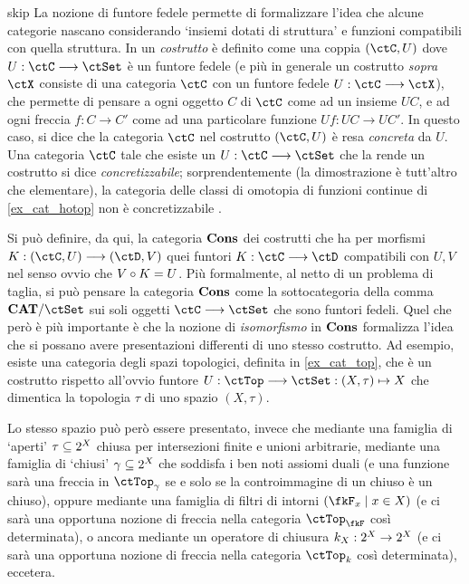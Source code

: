 \begin{hDigression}{skip}\label{def_costrutto}
	La nozione di funtore fedele permette di formalizzare l'idea che alcune categorie nascano considerando `insiemi dotati di struttura' e funzioni compatibili con quella struttura. In \cite[I.5.1]{acc} un \emph{costrutto} è definito come una coppia \((\ctC,U)\) dove \(U : \ctC \fun\ctSet\) è un funtore fedele (e più in generale un costrutto \emph{sopra \(\ctX\)} consiste di una categoria \(\ctC\) con un funtore fedele \(U : \ctC\fun\ctX\)), che permette di pensare a ogni oggetto \(C\) di \(\ctC\) come ad un insieme \(UC\), e ad ogni freccia \(f : C\to C'\) come ad una particolare funzione \(Uf : UC\to UC'\). In questo caso, si dice che la categoria \(\ctC\) nel costrutto \((\ctC,U)\) è resa \emph{concreta} da \(U\). Una categoria \(\ctC\) tale che esiste un \(U : \ctC \fun\ctSet\) che la rende un costrutto si dice \emph{concretizzabile}; sorprendentemente (la dimostrazione è tutt'altro che elementare), la categoria delle classi di omotopia di funzioni continue di \ref{ex_cat_hotop} non è concretizzabile \cite{Freydconc}.

	Si può definire, da qui, la categoria \(\mathbf{Cons}\) dei costrutti che ha per morfismi \(K : (\ctC,U)\fun (\ctD,V)\) quei funtori \(K : \ctC\fun\ctD\) compatibili con \(U,V\) nel senso ovvio che \(V\circ K=U\). Più formalmente, al netto di un problema di taglia, si può pensare la categoria \(\mathbf{Cons}\) come la sottocategoria della comma \(\cate{CAT}/\ctSet\) sui soli oggetti \(\ctC\fun\ctSet\) che sono funtori fedeli. Quel che però è più importante è che la nozione di \emph{isomorfismo} in \(\mathbf{Cons}\) formalizza l'idea che si possano avere presentazioni differenti di uno stesso costrutto. Ad esempio, esiste una categoria degli spazi topologici, definita in \ref{ex_cat_top}, che è un costrutto rispetto all'ovvio funtore \(U : \ctTop\fun\ctSet : (X,\tau)\mapsto X\) che dimentica la topologia \(\tau\) di uno spazio \((X,\tau)\).

	Lo stesso spazio può però essere presentato, invece che mediante una famiglia di `aperti' \(\tau \subseteq 2^{X}\) chiusa per intersezioni finite e unioni arbitrarie, mediante una famiglia di `chiusi' \(\gamma\subseteq 2^{X}\) che soddisfa i ben noti assiomi duali (e una funzione sarà una freccia in \(\ctTop_\gamma\) se e solo se la controimmagine di un chiuso è un chiuso), oppure mediante una famiglia di filtri di intorni \((\fkF_x \mid x\in X)\) (e ci sarà una opportuna nozione di freccia nella categoria \(\ctTop_\fkF\) così determinata), o ancora mediante un operatore di chiusura \(k_X : 2^{X}\to 2^{X}\) (e ci sarà una opportuna nozione di freccia nella categoria \(\ctTop_k\) così determinata), eccetera.


\end{hDigression}
